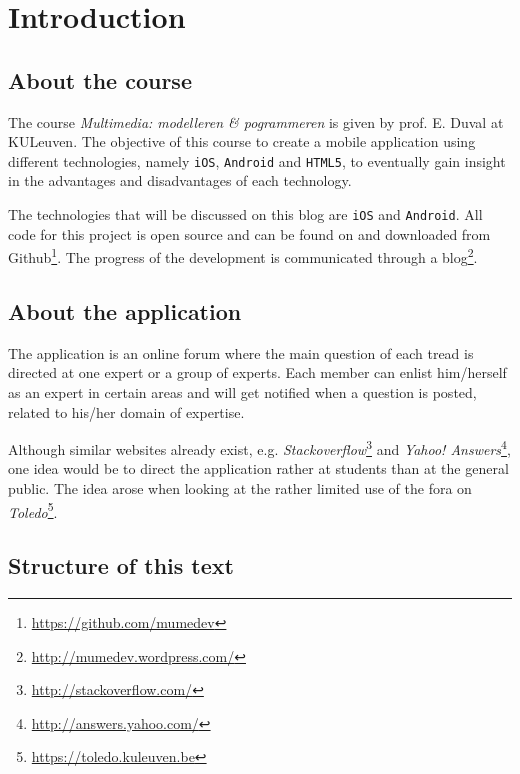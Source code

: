 \chapter{Introduction}

\section{About the course}

The course \emph{Multimedia: modelleren \& pogrammeren} is given by prof. E. Duval at KULeuven. The objective of this course to create a mobile application using different technologies, namely \texttt{iOS}, \texttt{Android} and \texttt{HTML5}, to eventually gain insight in the advantages and disadvantages of each technology.

The technologies that will be discussed on this blog are \texttt{iOS} and \texttt{Android}. All code for this project is open source and can be found on and downloaded from Github\footnote{\url{https://github.com/mumedev}}. The progress of the development is communicated through a blog\footnote{\url{http://mumedev.wordpress.com/}}.


\section{About the application}

The application is an online forum where the main question of each tread is directed at one expert or a group of experts. Each member can enlist him/herself as an expert in certain areas and will get notified when a question is posted, related to his/her domain of expertise.


Although similar websites already exist, e.g. \emph{Stackoverflow}\footnote{\url{http://stackoverflow.com/}} and \emph{Yahoo! Answers}\footnote{\url{http://answers.yahoo.com/}}, one idea would be to direct the application rather at students than at the general public. The idea arose when looking at the rather limited use of the fora on \emph{Toledo}\footnote{\url{https://toledo.kuleuven.be}}.


\section{Structure of this text}

